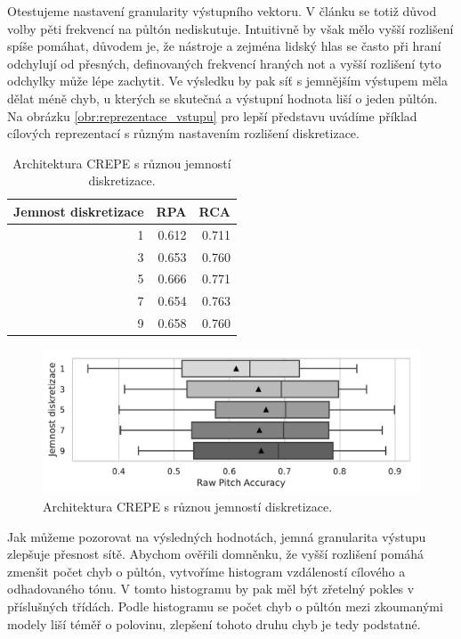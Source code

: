 Otestujeme nastavení granularity výstupního vektoru. V článku \cite{Kim2018} se totiž důvod volby pěti frekvencí na půltón nediskutuje. Intuitivně by však mělo vyšší rozlišení spíše pomáhat, důvodem je, že nástroje a zejména lidský hlas se často při hraní odchylují od přesných, definovaných frekvencí hraných not a vyšší rozlišení tyto odchylky může lépe zachytit. Ve výsledku by pak síť s jemnějším výstupem měla dělat méně chyb, u kterých se skutečná a výstupní hodnota liší o jeden půltón. Na obrázku \ref{obr:reprezentace_vstupu} pro lepší představu uvádíme příklad cílových reprezentací s různým nastavením rozlišení diskretizace.

\begin{table}[h!]

\centering
    \begin{tabular}{rrr}
    \toprule
    Jemnost diskretizace &   RPA &   RCA \\
    \midrule
                    1 & 0.612 & 0.711 \\
                    3 & 0.653 & 0.760 \\
                    5 & 0.666 & 0.771 \\
                    7 & 0.654 & 0.763 \\
                    9 & 0.658 & 0.760 \\
    \bottomrule
    \end{tabular}

\caption{Architektura CREPE s různou jemností diskretizace.}\label{tab:crepe_diskretizace}

\end{table}

\begin{figure}[h]\centering
    \includegraphics[scale=0.6]{../img/figures/crepe_diskretizace_grey}
\caption{Architektura CREPE s různou jemností diskretizace.}\label{obr:crepe_diskretizace}
\end{figure}

Jak můžeme pozorovat na výsledných hodnotách, jemná granularita výstupu zlepšuje přesnost sítě. Abychom ověřili domněnku, že vyšší rozlišení pomáhá zmenšit počet chyb o půltón, vytvoříme histogram vzdáleností cílového a odhadovaného tónu. V tomto histogramu by pak měl být zřetelný pokles v příslušných třídách. Podle histogramu se počet chyb o půltón mezi zkoumanými modely liší téměř o polovinu, zlepšení tohoto druhu chyb je tedy podstatné.

